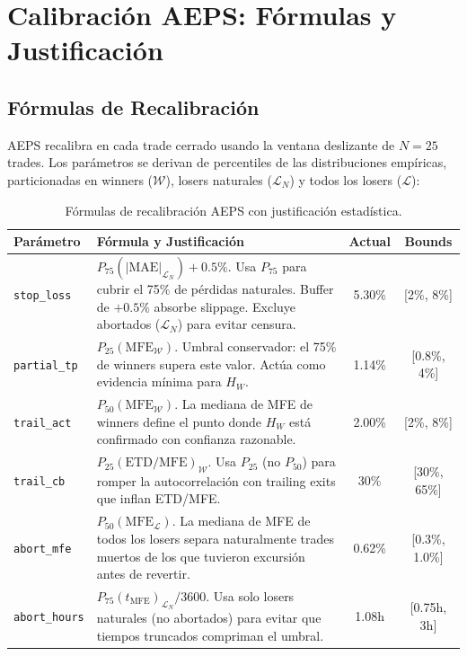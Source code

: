 \documentclass[11pt,a4paper]{article}
\newcommand{\param}[1]{\texttt{\small\color{cpurple}#1}}
\begin{document}
\section{Calibraci\'on AEPS: F\'ormulas y Justificaci\'on}
\label{sec:calibration}

\subsection{F\'ormulas de Recalibraci\'on}

AEPS recalibra en cada trade cerrado usando la ventana deslizante
de $N=25$ trades. Los par\'ametros se derivan de percentiles de las
distribuciones emp\'iricas, particionadas en winners ($\mathcal{W}$),
losers naturales ($\mathcal{L}_N$) y todos los losers ($\mathcal{L}$):

\begin{table}[H]
\centering
\caption{F\'ormulas de recalibraci\'on AEPS con justificaci\'on estad\'istica.}
\label{tab:calibration}
\begin{tabularx}{\textwidth}{lXcc}
\toprule
\textbf{Par\'ametro} & \textbf{F\'ormula y Justificaci\'on} & \textbf{Actual} & \textbf{Bounds} \\
\midrule
\param{stop\_loss} & $P_{75}(|\text{MAE}|_{\mathcal{L}_N}) + 0.5\%$. Usa $P_{75}$ para
  cubrir el 75\% de p\'erdidas naturales. Buffer de $+0.5\%$ absorbe
  slippage. Excluye abortados ($\mathcal{L}_N$) para evitar censura. & 5.30\% & [2\%, 8\%] \\
\addlinespace
\param{partial\_tp} & $P_{25}(\text{MFE}_{\mathcal{W}})$. Umbral conservador:
  el 75\% de winners supera este valor. Act\'ua como evidencia
  m\'inima para $H_W$. & 1.14\% & [0.8\%, 4\%] \\
\addlinespace
\param{trail\_act} & $P_{50}(\text{MFE}_{\mathcal{W}})$. La mediana de MFE
  de winners define el punto donde $H_W$ est\'a confirmado con
  confianza razonable. & 2.00\% & [2\%, 8\%] \\
\addlinespace
\param{trail\_cb} & $P_{25}(\text{ETD}/\text{MFE})_{\mathcal{W}}$. Usa $P_{25}$
  (no $P_{50}$) para romper la autocorrelaci\'on con trailing exits
  que inflan ETD/MFE. & 30\% & [30\%, 65\%] \\
\addlinespace
\param{abort\_mfe} & $P_{50}(\text{MFE}_{\mathcal{L}})$. La mediana de MFE
  de todos los losers separa naturalmente trades muertos de los que
  tuvieron excursi\'on antes de revertir. & 0.62\% & [0.3\%, 1.0\%] \\
\addlinespace
\param{abort\_hours} & $P_{75}(t_{\text{MFE}})_{\mathcal{L}_N} / 3600$. Usa
  solo losers naturales (no abortados) para evitar que tiempos
  truncados compriman el umbral. & 1.08h & [0.75h, 3h] \\
\bottomrule
\end{tabularx}
\end{table}
\end{document}
